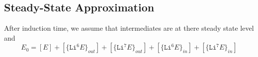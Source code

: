 \documentclass[aps,onecolumn]{revtex4}
\newcommand{\mychem}[1]{\mathtt{#1}}
\begin{document}
\subsection{Steady-State Approximation}
After induction time, we assume that intermediates are at there steady state level
and
\begin{equation}
	E_0 = [E] 
	+ [\lbrace\mychem{Li}^6E\rbrace_{out}]
	+ [\lbrace\mychem{Li}^7E\rbrace_{out}]
	+ [\lbrace\mychem{Li}^6E\rbrace_{in}]
	+ [\lbrace\mychem{Li}^7E\rbrace_{in}]
\end{equation}
\end{document}
